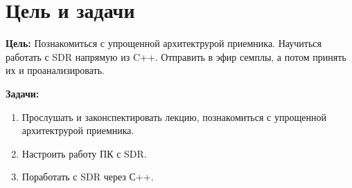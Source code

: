 \chapter{Цель и задачи}
\label{ch:intro}

\noindent
\textbf{Цель:}  
Познакомиться с упрощенной архитектрурой приемника. Научиться работать с SDR напрямую из C++. Отправить в эфир семплы, а потом принять
их и проанализировать.

\vspace{0.5cm}

\noindent
\textbf{Задачи:}
\begin{enumerate}
    \item Прослушать и законспектировать лекцию, познакомиться с упрощенной архитектрурой приемника.
    \item Настроить работу ПК с SDR.
    \item Поработать с SDR через С++.
\end{enumerate}

\endinput